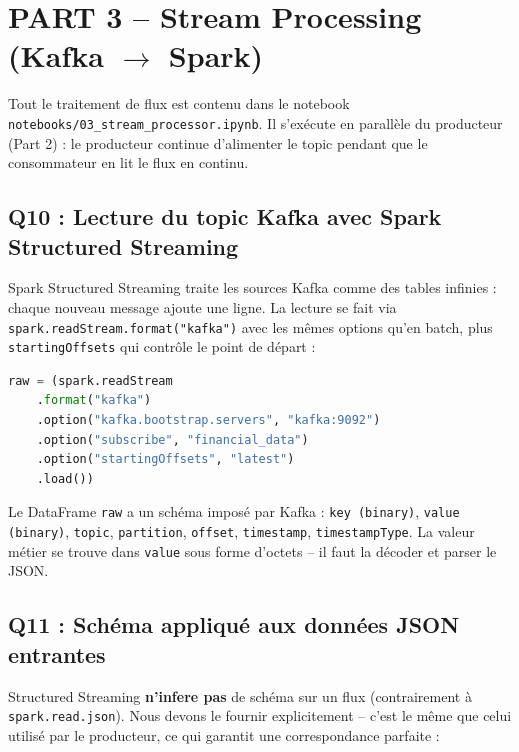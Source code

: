 \documentclass{RapportINPTCLOUD}
\begin{document}
\section{PART 3 -- Stream Processing (Kafka $\rightarrow$ Spark)}

Tout le traitement de flux est contenu dans le notebook \texttt{notebooks/03\_stream\_processor.ipynb}. Il s'ex\'{e}cute en parall\`{e}le du producteur (Part 2) : le producteur continue d'alimenter le topic pendant que le consommateur en lit le flux en continu.

\subsection{Q10 : Lecture du topic Kafka avec Spark Structured Streaming}

Spark Structured Streaming traite les sources Kafka comme des tables infinies : chaque nouveau message ajoute une ligne. La lecture se fait via \texttt{spark.readStream.format("kafka")} avec les m\^{e}mes options qu'en batch, plus \texttt{startingOffsets} qui contr\^{o}le le point de d\'{e}part :

\begin{lstlisting}[style=code, language=Python, caption=Lecture streaming de Kafka]
raw = (spark.readStream
    .format("kafka")
    .option("kafka.bootstrap.servers", "kafka:9092")
    .option("subscribe", "financial_data")
    .option("startingOffsets", "latest")
    .load())
\end{lstlisting}

Le DataFrame \texttt{raw} a un sch\'{e}ma impos\'{e} par Kafka : \texttt{key (binary)}, \texttt{value (binary)}, \texttt{topic}, \texttt{partition}, \texttt{offset}, \texttt{timestamp}, \texttt{timestampType}. La valeur m\'{e}tier se trouve dans \texttt{value} sous forme d'octets -- il faut la d\'{e}coder et parser le JSON.

\subsection{Q11 : Sch\'{e}ma appliqu\'{e} aux donn\'{e}es JSON entrantes}

Structured Streaming \textbf{n'infere pas} de sch\'{e}ma sur un flux (contrairement \`{a} \texttt{spark.read.json}). Nous devons le fournir explicitement -- c'est le m\^{e}me que celui utilis\'{e} par le producteur, ce qui garantit une correspondance parfaite :
\end{document}
